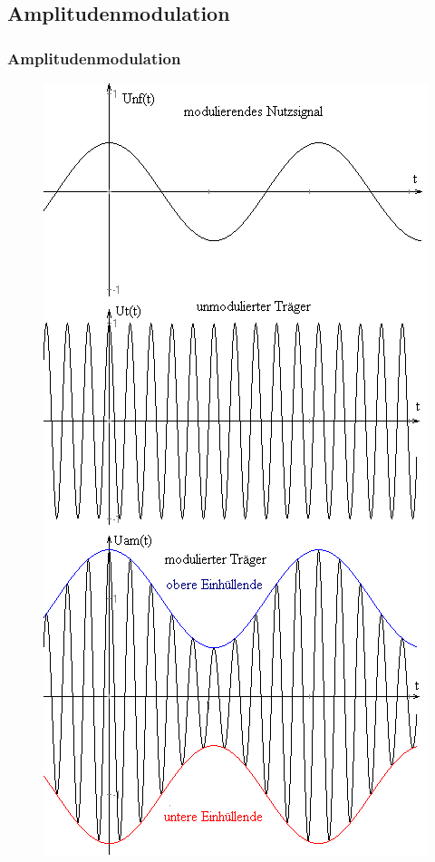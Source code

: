 \subsection[AM]{Amplitudenmodulation}
\begin{frame}
\frametitle{Amplitudenmodulation}
\begin{minipage}{0.3\textwidth}
    \begin{figure}
      \includegraphics[width=1\textwidth,height=.75\textheight,keepaspectratio]{e14/AM1.png}

\end{figure}
\end{minipage}
\end{frame}
